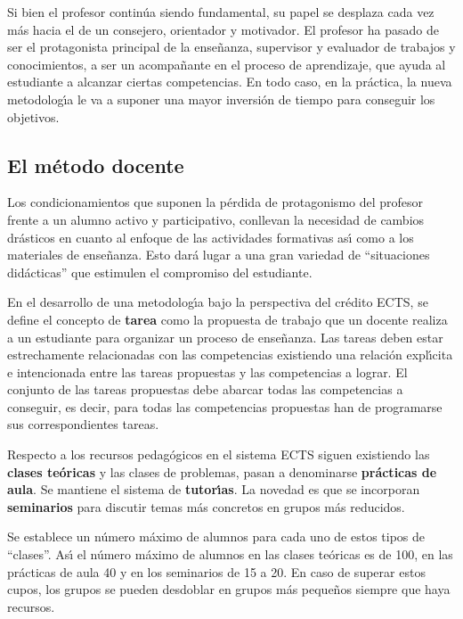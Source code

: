 Si bien el  profesor contin\'{u}a siendo fundamental, su papel
{  se desplaza cada vez m\'{a}s hacia el de un consejero, orientador
y motivador}.
El profesor ha pasado de ser el protagonista
principal de la ense\~{n}anza, supervisor y evaluador de trabajos
y conocimientos, a ser un acompa\~{n}ante en el proceso de
aprendizaje, que ayuda al estudiante a alcanzar ciertas competencias.
En todo caso, en la pr\'{a}ctica, la nueva metodolog\'{\i}a
le va a  suponer una mayor inversi\'{o}n de tiempo para conseguir
los objetivos. 


\subsection{El m\'{e}todo docente}
Los condicionamientos que suponen la p\'{e}rdida de protagonismo del 
profesor frente a un alumno activo y participativo, conllevan la necesidad
de cambios dr\'{a}sticos en cuanto al enfoque de las {  actividades 
formativas} as\'{\i} como a los {  materiales de ense\~{n}anza}.
Esto dar\'{a} lugar a una gran variedad de ``situaciones did\'{a}cticas''
que estimulen el compromiso del estudiante.


En el desarrollo de una metodolog\'{\i}a bajo
la perspectiva del cr\'{e}dito ECTS, se define el 
concepto de  {\bf  tarea} como la {  propuesta de trabajo} que un docente 
realiza a un estudiante para organizar un proceso de ense\~{n}anza.
Las tareas deben estar 
estrechamente relacionadas con las  
competencias existiendo una relaci\'{o}n expl\'{\i}cita e intencionada
entre las tareas propuestas y las competencias a lograr.
El conjunto de las tareas propuestas debe abarcar todas las competencias
a conseguir, es decir, para todas las competencias propuestas han de 
programarse sus correspondientes tareas. 


Respecto a los recursos pedag\'{o}gicos en el sistema ECTS 
siguen  existiendo las {\bf   clases te\'{o}ricas} y las 
clases de problemas, pasan a denominarse {\bf  pr\'{a}cticas de aula}. 
Se mantiene el sistema de {\bf   tutor\'{\i}as}.  La
novedad es que se incorporan {\bf seminarios} para 
discutir temas m\'{a}s concretos en grupos m\'{a}s reducidos.  

Se establece un n\'{u}mero m\'{a}ximo de alumnos para cada uno de estos tipos
de
``clases''. As\'{\i} el n\'{u}mero m\'{a}ximo de alumnos en las clases
te\'{o}ricas es de 100, en las pr\'{a}cticas de aula 40 y en los
seminarios de 15 a 20. En caso de superar estos cupos, los grupos
se pueden  desdoblar en grupos m\'{a}s peque\~{n}os  siempre que haya recursos.


